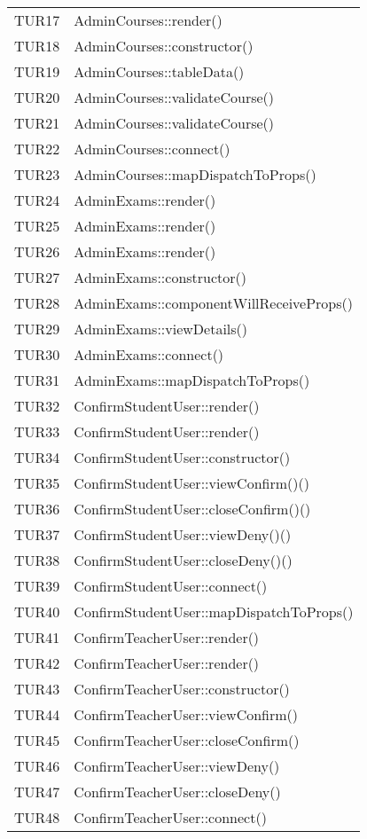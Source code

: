 \documentclass[PianoDiQualifica.tex]{subfiles}
\begin{document}
\begin{longtable}[H]{P{5cm}P{9cm}}
	TUR17 & AdminCourses::render() \\ 
	TUR18 & AdminCourses::constructor() \\ 
	TUR19 & AdminCourses::tableData() \\ 
	TUR20 & AdminCourses::validateCourse() \\ 
	TUR21 & AdminCourses::validateCourse() \\ 
	TUR22 & AdminCourses::connect() \\ 
	TUR23 & AdminCourses::mapDispatchToProps() \\ 
	TUR24 & AdminExams::render() \\ 
	TUR25 & AdminExams::render() \\ 
	TUR26 & AdminExams::render() \\ 
	TUR27 & AdminExams::constructor() \\ 
	TUR28 & AdminExams::componentWillReceiveProps() \\ 
	TUR29 & AdminExams::viewDetails() \\ 
	TUR30 & AdminExams::connect() \\ 
	TUR31 & AdminExams::mapDispatchToProps() \\ 
	TUR32 & ConfirmStudentUser::render() \\ 
	TUR33 & ConfirmStudentUser::render() \\ 
	TUR34 & ConfirmStudentUser::constructor() \\ 
	TUR35 & ConfirmStudentUser::viewConfirm()() \\ 
	TUR36 & ConfirmStudentUser::closeConfirm()() \\ 
	TUR37 & ConfirmStudentUser::viewDeny()() \\ 
	TUR38 & ConfirmStudentUser::closeDeny()() \\ 
	TUR39 & ConfirmStudentUser::connect() \\ 
	TUR40 & ConfirmStudentUser::mapDispatchToProps() \\ 
	TUR41 & ConfirmTeacherUser::render() \\ 
	TUR42 & ConfirmTeacherUser::render() \\ 
	TUR43 & ConfirmTeacherUser::constructor() \\ 
	TUR44 & ConfirmTeacherUser::viewConfirm() \\ 
	TUR45 & ConfirmTeacherUser::closeConfirm() \\ 
	TUR46 & ConfirmTeacherUser::viewDeny() \\ 
	TUR47 & ConfirmTeacherUser::closeDeny() \\ 
	TUR48 & ConfirmTeacherUser::connect() \\ 

\end{longtable}
\end{document}
